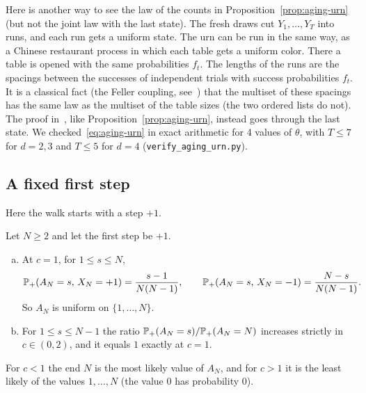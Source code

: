 \begin{remark}\label{rem:aging-feller}
Here is another way to see the law of the counts in
Proposition~\ref{prop:aging-urn} (but not the joint law with the last state).
The fresh draws
cut $Y_1,\dots,Y_T$ into runs, and each run gets a uniform state. The urn can
be run in the same way, as a Chinese restaurant process in which each table
gets a uniform color. There a table is opened with the same probabilities
$f_t$. The lengths of the runs are the spacings between the successes of
independent trials with success probabilities $f_t$. It is a classical
fact (the Feller coupling, see~\cite{abt2003}) that the multiset of these spacings has
the same law as the multiset of the table sizes (the two ordered lists do not).
The proof in~, like
Proposition~\ref{prop:aging-urn}, instead goes through the last state. We
checked~\eqref{eq:aging-urn} in exact arithmetic for 4 values of $\theta$,
with $T\le7$ for $d=2,3$ and $T\le5$ for $d=4$
(\texttt{verify\_aging\_urn.py}).
\end{remark}

\subsection{A fixed first step}

Here the walk starts with a step $+1$.

\begin{proposition}\label{prop:aging-two}
Let $N\ge2$ and let the first step be $+1$.
\begin{enumerate}[(a)]
\item At $c=1$, for $1\le s\le N$,
\[
 \mathbb{P}_+(A_N=s,\,X_N=+1)=\frac{s-1}{N(N-1)},\qquad
 \mathbb{P}_+(A_N=s,\,X_N=-1)=\frac{N-s}{N(N-1)}.
\]
So $A_N$ is uniform on $\{1,\dots,N\}$.
\item For $1\le s\le N-1$ the ratio $\mathbb{P}_+(A_N=s)/\mathbb{P}_+(A_N=N)$ increases
strictly in $c\in(0,2)$, and it equals $1$ exactly at $c=1$.
\end{enumerate}
\end{proposition}

For $c<1$ the end $N$ is the most likely value of $A_N$, and for $c>1$ it is
the least likely of the values $1,\dots,N$ (the value $0$ has probability
$0$).


